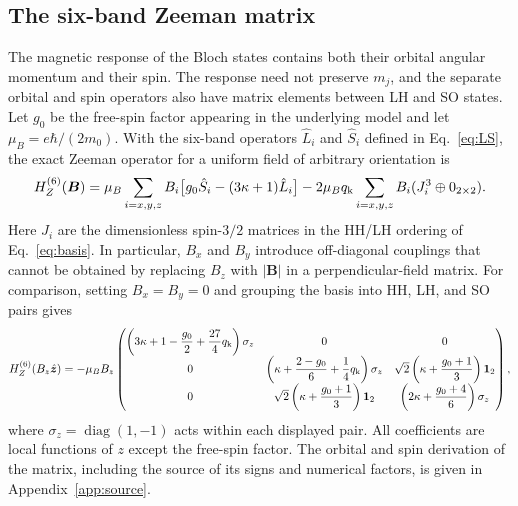 \subsection{The six-band Zeeman matrix}

The magnetic response of the Bloch states contains both their orbital angular momentum and their spin. The response need not preserve $m_j$, and the separate orbital and spin operators also have matrix elements between LH and SO states. Let $g_0$ be the free-spin factor appearing in the underlying model and let $\mu_B=e\hbar/(2m_0)$. With the six-band operators $\hat L_i$ and $\hat S_i$ defined in Eq.~\eqref{eq:LS}, the exact Zeeman operator for a uniform field of arbitrary orientation is
\begin{equation}
H_Z^{(6)}(\bm B)
=\mu_B\sum_{i=x,y,z}B_i\bigl[g_0\hat S_i-(3\kappa+1)\hat L_i\bigr]
-2\mu_Bq_{\mathrm k}\sum_{i=x,y,z}B_i(J_i^3\oplus0_{2\times2}).
\label{eq:HZvector}
\end{equation}
Here $J_i$ are the dimensionless spin-$3/2$ matrices in the HH/LH ordering of Eq.~\eqref{eq:basis}. In particular, $B_x$ and $B_y$ introduce off-diagonal couplings that cannot be obtained by replacing $B_z$ with $|\bm B|$ in a perpendicular-field matrix. For comparison, setting $B_x=B_y=0$ and grouping the basis into HH, LH, and SO pairs gives
\begin{equation}
H_Z^{(6)}(B_z\hat{\bm z})=-\mu_BB_z
\begin{pmatrix}
\left(3\kappa+1-\dfrac{g_0}{2}+\dfrac{27}{4}q_{\mathrm k}\right)\sigma_z
&0&0\\[6pt]
0&\left(\kappa+\dfrac{2-g_0}{6}+\dfrac14q_{\mathrm k}\right)\sigma_z
&\sqrt2\left(\kappa+\dfrac{g_0+1}{3}\right)\mathbf 1_2\\[6pt]
0&\sqrt2\left(\kappa+\dfrac{g_0+1}{3}\right)\mathbf 1_2
&\left(2\kappa+\dfrac{g_0+4}{6}\right)\sigma_z
\end{pmatrix},
\label{eq:HZ}
\end{equation}
where $\sigma_z=\operatorname{diag}(1,-1)$ acts within each displayed pair. All coefficients are local functions of $z$ except the free-spin factor. The orbital and spin derivation of the matrix, including the source of its signs and numerical factors, is given in Appendix~\ref{app:source}.

